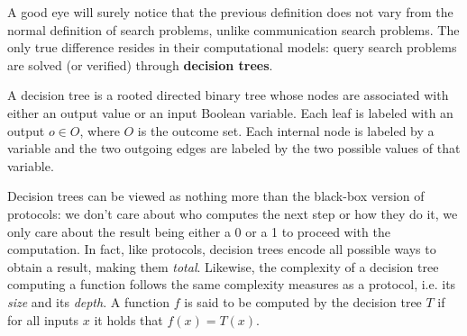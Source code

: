 A good eye will surely notice that the previous definition does not vary from the normal definition of search problems, unlike communication search problems. The only true difference resides in their computational models: query search problems are solved (or verified) through \textbf{decision trees}.

\begin{definition}
 A decision tree is a rooted directed binary tree whose nodes are associated with either an output value or an input Boolean variable. Each leaf is labeled with an output $o \in O$, where $O$ is the outcome set. Each internal node is labeled by a variable and the two outgoing edges are labeled by the two possible values of that variable.
\end{definition}

Decision trees can be viewed as nothing more than the black-box version of protocols: we don't care about who computes the next step or how they do it, we only care about the result being either a 0 or a 1 to proceed with the computation. In fact, like protocols, decision trees encode all possible ways to obtain a result, making them \textit{total}. Likewise, the complexity of a decision tree computing a function follows the same complexity measures as a protocol, i.e. its \textit{size} and its \textit{depth}. A function $f$ is said to be computed by the decision tree $T$ if for all inputs $x$ it holds that $f(x) = T(x)$. 

